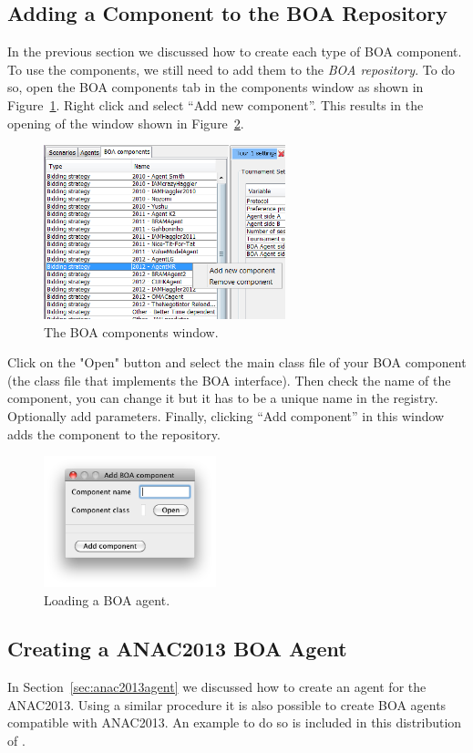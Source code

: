 \documentclass[]{article}
\begin{document}
\subsection{Adding a Component to the BOA Repository}
In the previous section we discussed how to create each type of BOA component. To use the components, we still need to add them to the \textit{BOA repository}. To do so, open the BOA components tab in the components window as shown in Figure~\ref{fig:boacomponents}. Right click and select ``Add new component''. This results in the opening of the window shown in Figure~\ref{fig:loadBOA}.

\begin{figure}[h!] 
	\center
	\includegraphics[width=7cm]{media/AddBOA.png}
	\caption{The BOA components window.}
	\label{fig:boacomponents}
\end{figure}

Click on the "Open" button and select the main class file of your BOA component (the class file that implements the BOA interface). Then check the name of the component, you can change it but it has to be a unique name in the registry. Optionally add parameters. Finally, clicking ``Add component'' in this window adds the component to the repository.

\begin{figure}[h!] 
	\center
	\includegraphics[width=5cm]{media/LoadBOA.png}
	\caption{Loading a BOA agent.}
	\label{fig:loadBOA}
\end{figure}


\subsection{Creating a ANAC2013 BOA Agent}\label{sec:anac2013agentBOA}
In Section~\ref{sec:anac2013agent} we discussed how to create an agent for the ANAC2013. Using a similar procedure it is also possible to create BOA agents compatible with ANAC2013. An example to do so is included in this distribution of \Genius.
\end{document}
